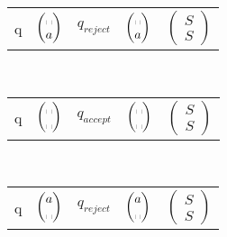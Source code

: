 \documentclass[11pt]{article}
\theoremstyle{definition}
\theoremstyle{case}
\theoremstyle{theorem}
\begin{document}
\vspace{10pt}

\begin{tabular}{l l l l l}
			q & 
			$\begin{pmatrix} \text{\textvisiblespace} \\ a \end{pmatrix}$ & 
			$q_{reject}$ & 
			$\begin{pmatrix} \text{\textvisiblespace} \\ a \end{pmatrix}$ & 
			$\begin{pmatrix} S \\ S \end{pmatrix}$
\end{tabular}\\

\vspace{10pt}

\begin{tabular}{l l l l l}
			q & 
			$\begin{pmatrix} \text{\textvisiblespace} \\ \text{\textvisiblespace} \end{pmatrix}$ & 
			$q_{accept}$ & 
			$\begin{pmatrix} \text{\textvisiblespace} \\ \text{\textvisiblespace} \end{pmatrix}$ & 
			$\begin{pmatrix} S \\ S \end{pmatrix}$
\end{tabular}\\

\vspace{10pt}

\begin{tabular}{l l l l l}
			q & 
			$\begin{pmatrix} a \\ \text{\textvisiblespace} \end{pmatrix}$ & 
			$q_{reject}$ & 
			$\begin{pmatrix} a \\ \text{\textvisiblespace} \end{pmatrix}$ & 
			$\begin{pmatrix} S \\ S \end{pmatrix}$
\end{tabular}\\
\end{document}
